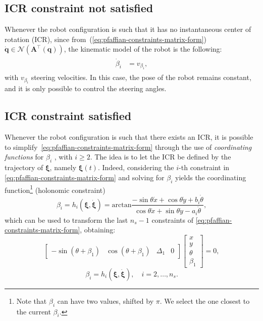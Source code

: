\subsection{ICR constraint not satisfied}
Whenever the robot configuration is such that it has no instantaneous center
of rotation (ICR), since from~(\ref{eq:pfaffian-constraints-matrix-form})
$\dot{\bm{q}} \in \mathcal{N}(\bm{A}^\top(\bm{q}))$, the kinematic model of
the robot is the following:
\begin{align*}
\begin{split}
    \dot{\beta}_i &= v_{\beta_i},
\end{split}
\end{align*}
with $v_{\beta_i}$ steering velocities. In this case, the pose of the robot
remains constant, and it is only possible to control the steering angles. 

\subsection{ICR constraint satisfied}
\label{sec:icr-constraint-satisfied}
Whenever the robot configuration is such that there exists an ICR,
it is possible to simplify~\eqref{eq:pfaffian-constraints-matrix-form}
through the use of \textit{coordinating functions} for $\beta_i$
\cite{RobuffoGiordano2009ICRA}, with $i \ge 2$. The idea is to let the ICR
be defined by the trajectory of $\bm{\xi}$, namely $\bm{\xi} \left( t \right)$.
Indeed, considering the $i$-th constraint in
\eqref{eq:pfaffian-constraints-matrix-form} and solving for $\beta_i$ yields
the coordinating function\footnote{Note that $\beta_i$ can have two values,
shifted by $\pi$. We select the one closest to the current $\beta_i$.}
(holonomic constraint)
\begin{equation}
    \label{eq:coordinating-function-pre-kinematic-model}
    \beta_i = h_i(\bm{\xi}, \dot{\bm{\xi}}) = \mathrm{arctan} \frac{-\sin\theta\dot{x}+\cos\theta\dot{y}+b_i\dot{\theta}}{\cos\theta\dot{x}+\sin\theta\dot{y}-a_i\dot{\theta}},
\end{equation}
which can be used to transform the last $n_s-1$ constraints of
\eqref{eq:pfaffian-constraints-matrix-form}, obtaining:
\begin{equation}
    \label{eq:reduced-pfaffian-constraints-matrix-form}
    \begin{bmatrix}
        -\sin(\theta + \beta_1) &
        \cos(\theta + \beta_1) &
        \Delta_1 &
        0
    \end{bmatrix}
    \begin{bmatrix}
        x \\ y \\ \theta \\ \beta_1
    \end{bmatrix}
    = 0,
\end{equation}
\begin{equation*}
    \beta_i = h_i(\bm{\xi}, \dot{\bm{\xi}}), \quad i = 2, \dots, n_s.
\end{equation*}

